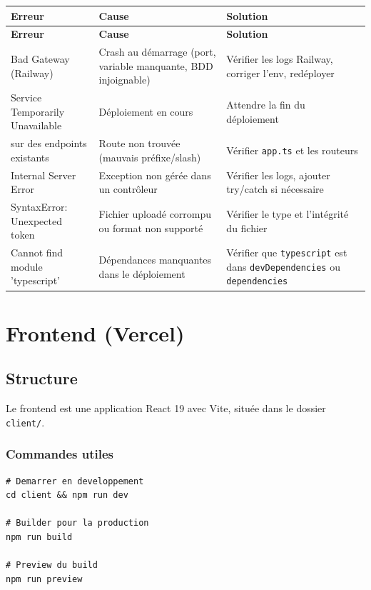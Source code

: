 \documentclass[12pt,a4paper]{report}
\begin{document}
\begin{longtable}{|>{\raggedright\arraybackslash}p{4cm}|>{\raggedright\arraybackslash}p{5cm}|>{\raggedright\arraybackslash}p{5cm}|}
\hline
\textbf{Erreur} & \textbf{Cause} & \textbf{Solution} \\
\hline
\endfirsthead
\hline
\textbf{Erreur} & \textbf{Cause} & \textbf{Solution} \\
\hline
\endhead
502 Bad Gateway (Railway) & Crash au démarrage (port, variable manquante, BDD injoignable) & Vérifier les logs Railway, corriger l'env, redéployer \\
\hline
503 Service Temporarily Unavailable & Déploiement en cours & Attendre la fin du déploiement \\
\hline
404 sur des endpoints existants & Route non trouvée (mauvais préfixe/slash) & Vérifier \texttt{app.ts} et les routeurs \\
\hline
500 Internal Server Error & Exception non gérée dans un contrôleur & Vérifier les logs, ajouter try/catch si nécessaire \\
\hline
SyntaxError: Unexpected token & Fichier uploadé corrompu ou format non supporté & Vérifier le type et l'intégrité du fichier \\
\hline
Cannot find module 'typescript' & Dépendances manquantes dans le déploiement & Vérifier que \texttt{typescript} est dans \texttt{devDependencies} ou \texttt{dependencies} \\
\hline
\end{longtable}

\chapter{Frontend (Vercel)}

\section{Structure}
Le frontend est une application React 19 avec Vite, située dans le dossier \texttt{client/}.

\subsection{Commandes utiles}
\begin{lstlisting}
# Demarrer en developpement
cd client && npm run dev

# Builder pour la production
npm run build

# Preview du build
npm run preview
\end{lstlisting}
\end{document}
